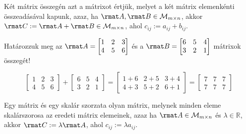 
\begin{definition}
  Két mátrix összegén azt a mátrixot értjük, melyet a két mátrix elemenkénti
  összeadásával kapunk, azaz, ha $\rmat A, \rmat B \in \mathcal M_{m \times n}$,
  akkor $\rmat C := \rmat A + \rmat B \in \mathcal M_{m \times n}$, ahol
  $c_{ij} := a_{ij} + b_{ij}$.
\end{definition}

\begin{example}
  Határozzuk meg az $\rmat A = \begin{bmatrix}
      1 & 2 & 3 \\
      4 & 5 & 6
    \end{bmatrix}$ és a $\rmat B = \begin{bmatrix}
      6 & 5 & 4 \\
      3 & 2 & 1
    \end{bmatrix}$ mátrixok összegét!

  \hdashrule[.8ex][x]{\dimexpr\textwidth}{1pt}{2mm 3pt}
  $$
    \begin{bmatrix}
      1 & 2 & 3 \\
      4 & 5 & 6
    \end{bmatrix}
    +
    \begin{bmatrix}
      6 & 5 & 4 \\
      3 & 2 & 1
    \end{bmatrix}
    =
    \begin{bmatrix}
      1 + 6 & 2 + 5 & 3 + 4 \\
      4 + 3 & 5 + 2 & 6 + 1
    \end{bmatrix}
    =
    \begin{bmatrix}
      7 & 7 & 7 \\
      7 & 7 & 7
    \end{bmatrix}
  $$
\end{example}

\begin{definition}
  Egy mátrix és egy skalár szorzata olyan mátrix, melynek minden eleme
  skalárszorosa az eredeti mátrix elemeinek, azaz ha
  $\rmat A \in \mathcal M_{m \times n}$ és $\lambda \in \mathbb R$, akkor
  $\rmat C := \lambda \rmat A$, ahol $c_{ij} := \lambda a_{ij}$.
\end{definition}

